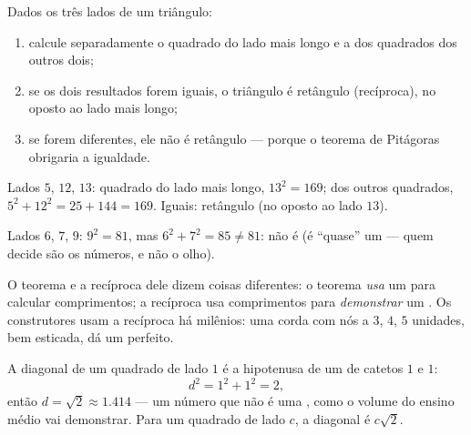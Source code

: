 \begin{method}\label{met:g8:pythagoras:test}
Dados os três lados de um triângulo:
\begin{enumerate}
  \item calcule separadamente o quadrado do lado mais longo e a 
        dos quadrados dos outros dois;
  \item se os dois resultados forem iguais, o triângulo é retângulo
        (recíproca), no  oposto ao lado mais longo;
  \item se forem diferentes, ele não é retângulo --- porque o teorema
        de Pitágoras obrigaria a igualdade.
\end{enumerate}
\end{method}

\begin{example}\label{ex:g8:pythagoras:test}
Lados $5$, $12$, $13$: quadrado do lado mais longo, $13^2 = 169$; 
dos outros quadrados, $5^2 + 12^2 = 25 + 144 = 169$. Iguais: retângulo
(no  oposto ao lado $13$).

Lados $6$, $7$, $9$: $9^2 = 81$, mas $6^2 + 7^2 = 85 \neq 81$: não é
 (é ``quase'' um --- quem decide são os números, e
não o olho).
\end{example}

\begin{remark}
O teorema e a recíproca dele dizem coisas diferentes: o teorema
\emph{usa} um  para calcular comprimentos; a recíproca usa
comprimentos para \emph{demonstrar} um . Os construtores
usam a recíproca há milênios: uma corda com nós a $3$, $4$, $5$
unidades, bem esticada, dá um  perfeito.
\end{remark}

\begin{example}\label{ex:g8:pythagoras:diagonal}
A diagonal de um quadrado de lado $1$ é a hipotenusa de um  de catetos $1$ e $1$:
\[
d^2 = 1^2 + 1^2 = 2 ,
\]
então $d = \sqrt2 \approx 1.414$ --- um número que não é uma ,
como o volume do ensino médio vai demonstrar. Para um quadrado de lado
$c$, a diagonal é $c\sqrt2$.
\end{example}

